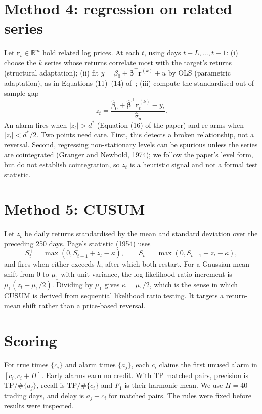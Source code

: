 \documentclass[12pt,a4paper]{report}
\theoremstyle{definition}\newtheorem{definition}{Definition}[chapter]
\begin{document}
\section{Method 4: regression on related series}
Let $\mathbf r_t\in\mathbb R^m$ hold related log prices. At each $t$, using days $t-L,\dots,t-1$: (i) choose the $k$ series whose returns correlate most with the target's returns (structural adaptation); (ii) fit $y=\beta_0+\boldsymbol\beta^\top\mathbf r^{(k)}+u$ by OLS (parametric adaptation), as in Equations (11)--(14) of~\cite{musaev2024}; (iii) compute the standardised out-of-sample gap
\begin{equation}z_t=\frac{\hat\beta_0+\hat{\boldsymbol\beta}^\top\mathbf r_t^{(k)}-y_t}{\hat\sigma_u}.\end{equation}
An alarm fires when $|z_t|>d^*$ (Equation (16) of the paper) and re-arms when $|z_t|<d^*/2$. Two points need care. First, this detects a broken relationship, not a reversal. Second, regressing non-stationary levels can be spurious unless the series are cointegrated (Granger and Newbold, 1974); we follow the paper's level form, but do not establish cointegration, so $z_t$ is a heuristic signal and not a formal test statistic.

\section{Method 5: CUSUM}
Let $z_t$ be daily returns standardised by the mean and standard deviation over the preceding 250 days. Page's statistic (1954) uses
\begin{equation}S_t^+=\max(0,S_{t-1}^++z_t-\kappa),\qquad S_t^-=\max(0,S_{t-1}^--z_t-\kappa),\end{equation}
and fires when either exceeds $h$, after which both restart. For a Gaussian mean shift from $0$ to $\mu_1$ with unit variance, the log-likelihood ratio increment is $\mu_1(z_t-\mu_1/2)$. Dividing by $\mu_1$ gives $\kappa=\mu_1/2$, which is the sense in which CUSUM is derived from sequential likelihood ratio testing. It targets a return-mean shift rather than a price-based reversal.

\section{Scoring}
For true times $\{c_i\}$ and alarm times $\{a_j\}$, each $c_i$ claims the first unused alarm in $[c_i,c_i+H]$. Early alarms earn no credit. With $\text{TP}$ matched pairs, precision is $\text{TP}/\#\{a_j\}$, recall is $\text{TP}/\#\{c_i\}$ and $F_1$ is their harmonic mean. We use $H=40$ trading days, and delay is $a_j-c_i$ for matched pairs. The rules were fixed before results were inspected.
\end{document}
